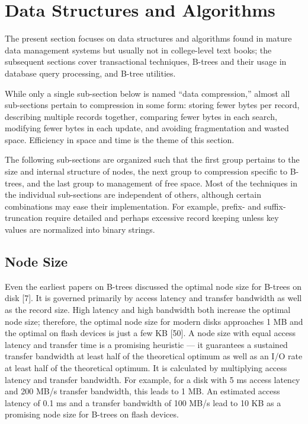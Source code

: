 \hypertarget{data-structures-and-algorithms}{%
\chapter{Data Structures and
Algorithms}\label{data-structures-and-algorithms}}

The present section focuses on data structures and algorithms found in
mature data management systems but usually not in college-level text
books; the subsequent sections cover transactional techniques, B-trees
and their usage in database query processing, and B-tree utilities.

While only a single sub-section below is named ``data compression,''
almost all sub-sections pertain to compression in some form: storing
fewer bytes per record, describing multiple records together, comparing
fewer bytes in each search, modifying fewer bytes in each update, and
avoiding fragmentation and wasted space. Efficiency in space and time is
the theme of this section.

The following sub-sections are organized such that the first group
pertains to the size and internal structure of nodes, the next group to
compression specific to B-trees, and the last group to management of
free space. Most of the techniques in the individual sub-sections are
independent of others, although certain combinations may ease their
implementation. For example, prefix- and suffix-truncation require
detailed and perhaps excessive record keeping unless key values are
normalized into binary strings.

\hypertarget{node-size}{%
\section{Node Size}\label{node-size}}

Even the earliest papers on B-trees discussed the optimal node size for
B-trees on disk {[}7{]}. It is governed primarily by access latency and
transfer bandwidth as well as the record size. High latency and high
bandwidth both increase the optimal node size; therefore, the optimal
node size for modern disks approaches 1 MB and the optimal on flash
devices is just a few KB {[}50{]}. A node size with equal access latency
and transfer time is a promising heuristic --- it guarantees a sustained
transfer bandwidth at least half of the theoretical optimum as well as
an I/O rate at least half of the theoretical optimum. It is calculated
by multiplying access latency and transfer bandwidth. For example, for a
disk with 5 ms access latency and 200 MB/s transfer bandwidth, this
leads to 1 MB. An estimated access latency of 0.1 ms and a transfer
bandwidth of 100 MB/s lead to 10 KB as a promising node size for B-trees
on flash devices.

